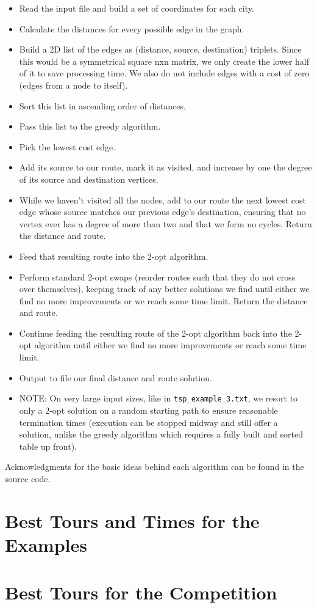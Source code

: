 \documentclass[paper=a4, fontsize=11pt]{scrartcl} %
\numberwithin{equation}{section} %
\numberwithin{figure}{section} %
\numberwithin{table}{section} %
\begin{document}
\begin{itemize}

  \item Read the input file and build a set of coordinates for each city.
  \item Calculate the distances for every possible edge in the graph.  
  \item Build a 2D list of the edges as (distance, source, destination) triplets. Since this would be a symmetrical square nxn matrix, we only create the lower half of it to save processing time. We also do not include edges with a cost of zero (edges from a node to itself).
  \item Sort this list in ascending order of distances.
  \item Pass this list to the greedy algorithm.
  \item Pick the lowest cost edge.
  \item Add its source to our route, mark it as visited, and increase by one the degree of its source and destination vertices.
  \item While we haven't visited all the nodes, add to our route the next lowest cost edge whose source matches our previous edge's destination, ensuring that no vertex ever has a degree of more than two and that we form no cycles. Return the distance and route.
  \item Feed that resulting route into the 2-opt algorithm.
  \item Perform standard 2-opt swaps (reorder routes such that they do not cross over themselves), keeping track of any better solutions we find until either we find no more improvements or we reach some time limit. Return the distance and route.
  \item Continue feeding the resulting route of the 2-opt algorithm back into the 2-opt algorithm until either we find no more improvements or reach some time limit.
  \item Output to file our final distance and route solution.
  \item NOTE: On very large input sizes, like in \verb|tsp_example_3.txt|, we resort to only a 2-opt solution on a random starting path to ensure reasonable termination times (execution can be stopped midway and still offer a solution, unlike the greedy algorithm which requires a fully built and sorted table up front).

\end{itemize}

Acknowledgments for the basic ideas behind each algorithm can be found in the source code.\newline

\section{Best Tours and Times for the Examples}


\section{Best Tours for the Competition}
\end{document}
